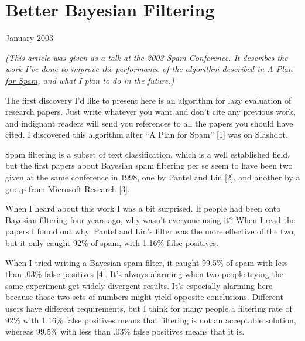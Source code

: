 \chapter{Better Bayesian Filtering}


            
              
                

January 2003

\emph{(This article was given as a talk at the 2003 Spam
                    Conference. It describes the work I've done to improve the
                    performance of the algorithm described in
                    \href{http://www.paulgraham.com/spam.html}{A Plan for Spam}, and what I plan to
                    do in the future.)}

The first discovery I'd like to present here is
                  an algorithm for lazy evaluation of research papers. Just
                  write whatever you want and don't cite any previous work, and
                  indignant readers will send you references to all the papers
                  you should have cited. I discovered this algorithm after ``A
                  Plan for Spam'' [1] was on Slashdot.

Spam filtering
                  is a subset of text classification, which is a well
                  established field, but the first papers about Bayesian spam
                  filtering per se seem to have been two given at the same
                  conference in 1998, one by Pantel and Lin [2], and another by
                  a group from Microsoft Research [3].

When I heard
                  about this work I was a bit surprised. If people had been onto
                  Bayesian filtering four years ago, why wasn't everyone using
                  it? When I read the papers I found out why. Pantel and Lin's
                  filter was the more effective of the two, but it only caught
                  92\% of spam, with 1.16\% false positives.

When I
                  tried writing a Bayesian spam filter, it caught 99.5\% of spam
                  with less than .03\% false positives [4]. It's always alarming
                  when two people trying the same experiment get widely
                  divergent results. It's especially alarming here because those
                  two sets of numbers might yield opposite conclusions.
                  Different users have different requirements, but I think for
                  many people a filtering rate of 92\% with 1.16\% false positives
                  means that filtering is not an acceptable solution, whereas
                  99.5\% with less than .03\% false positives means that it is.

